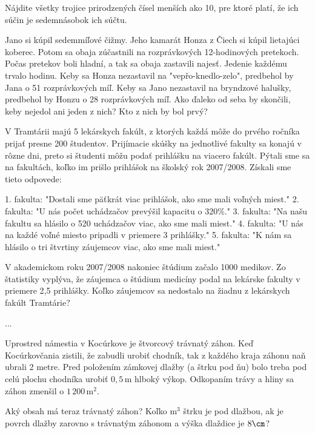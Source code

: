 {%
Nájdite všetky trojice prirodzených čísel menších ako 10, pre ktoré platí, že ich súčin je
sedemnásobok ich súčtu.}

{%
Jano si kúpil sedemmíľové čižmy. Jeho kamarát Honza z Čiech si kúpil lietajúci koberec.
Potom sa obaja zúčastnili na rozprávkových 12-hodinových pretekoch. Počas pretekov boli
hladní, a tak sa obaja zastavili najesť. Jedenie každému trvalo hodinu. Keby sa Honza
nezastavil na "vepřo-knedlo-zelo", predbehol by Jana o 51 rozprávkových míľ. Keby sa Jano
nezastavil na bryndzové halušky, predbehol by Honzu o 28 rozprávkových míľ. Ako ďaleko
od seba by skončili, keby nejedol ani jeden z nich? Kto z nich by bol prvý?}

{%
V Tramtárii majú 5 lekárskych fakúlt, z ktorých každá môže do prvého ročníka prijať presne
200 študentov. Prijímacie skúšky na jednotlivé fakulty sa konajú v rôzne dni, preto si študenti
môžu podať prihlášku na viacero fakúlt. Pýtali sme sa na fakultách, koľko im prišlo prihlášok
na školský rok 2007/2008. Získali sme tieto odpovede:
\begin{itemize}
\itemvar{} 1. fakulta: "Dostali sme päťkrát viac prihlášok, ako sme mali voľných miest."
\itemvar{} 2. fakulta: "U nás počet uchádzačov prevýšil kapacitu o 320\%."
\itemvar{} 3. fakulta: "Na našu fakultu sa hlásilo o 520 uchádzačov viac, ako sme mali miest."
\itemvar{} 4. fakulta: "U nás na každé voľné miesto pripadli v priemere 3 prihlášky."
\itemvar{} 5. fakulta: "K nám sa hlásilo o tri štvrtiny záujemcov viac, ako sme mali miest."
\end{itemize}
\noindent
V akademickom roku 2007/2008 nakoniec štúdium začalo 1000 medikov. Zo štatistiky
vyplýva, že záujemca o štúdium medicíny podal na lekárske fakulty v priemere 2{,}5 prihlášky.
Koľko záujemcov sa nedostalo na žiadnu z lekárskych fakúlt Tramtárie?}

{%
...}

{%
Uprostred námestia v Kocúrkove je štvorcový trávnatý záhon. Keď Kocúrkovčania zistili, že
zabudli urobiť chodník, tak z každého kraja záhonu naň ubrali 2 metre. Pred položením
zámkovej dlažby (a štrku pod ňu) bolo treba pod celú plochu chodníka urobiť $0{,}5\,\text{m}$ hlboký
výkop. Odkopaním trávy a hliny sa záhon zmenšil o $1\,200\,\text{m}^2$.
\begin{itemize}
 Aký obsah má teraz trávnatý záhon?
 Koľko $\text{m}^3$ štrku je pod dlažbou, ak je povrch dlažby zarovno s trávnatým záhonom a výška
dlaždice je $8\cm$?
\end{itemize}
}

